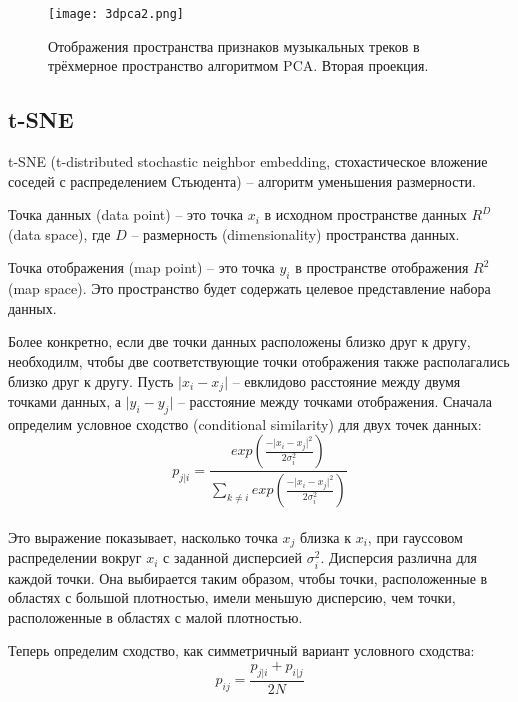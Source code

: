 \begin{figure}[!h]
\centering
  \texttt{[image: 3dpca2.png]}
  \caption{Отображения пространства  признаков музыкальных треков в трёхмерное пространство алгоритмом PCA. Вторая проекция. }
  \label{fig:results:2dtsne}
\end{figure}


\subsection{t-SNE} 
\label{sub:tsne}
t-SNE (t-distributed stochastic neighbor embedding, стохастическое вложение соседей с распределением Стьюдента) -- алгоритм уменьшения размерности.

Точка данных (data point) – это точка $ x_i $ в исходном пространстве данных $ R^D $ (data space), где $  D $ – размерность (dimensionality) пространства данных.

Точка отображения (map point) – это точка $ y_i $ в пространстве отображения $ R^2 $ (map space). Это пространство будет содержать целевое представление набора данных.

 Более конкретно, если две точки данных расположены близко друг к другу, необходилм, чтобы две соответствующие точки отображения также располагались близко друг к другу. Пусть $  \vert x_i -  x_j \vert $ – евклидово расстояние между двумя точками данных, а  $ \vert y_i - y_j \vert$ – расстояние между точками отображения. Сначала определим условное сходство (conditional similarity) для двух точек данных:
\begin{equation}\label{eq:conditionsimilarity}
p_{j \vert i}  = \frac{ exp(\frac{- \vert x_i - x_j \vert^2}{2\sigma_i^2})}{  \sum \limits_{k \neq i}^{} exp(\frac{- \vert x_i - x_j \vert^2}{2\sigma_i^2})}
\end{equation}  \\
Это выражение показывает, насколько точка $x_j$ близка к $x_i$, при гауссовом распределении вокруг $ x_i $ с заданной дисперсией $ \sigma_i^2 $. Дисперсия различна для каждой точки. Она выбирается таким образом, чтобы точки, расположенные в областях с большой плотностью, имели меньшую дисперсию, чем точки, расположенные в областях с малой плотностью. 

Теперь определим сходство, как симметричный вариант условного сходства:
\begin{equation}\label{eq:similarity}
 p_{ij} = \frac{p_{j \vert i} +  p_{i \vert j} }{2N}
\end{equation}  \\

